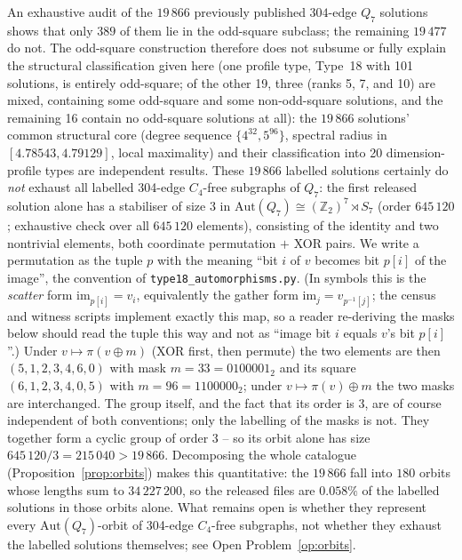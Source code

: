 \documentclass[12pt,a4paper]{article}
\theoremstyle{definition}
\begin{document}
An exhaustive audit of the $19\,866$ previously published $304$-edge $Q_7$
solutions shows that only $389$ of them lie in the odd-square subclass; the
remaining $19\,477$ do not. The odd-square construction therefore does
not subsume or fully explain the structural classification given here
(one profile type, Type~18 with 101 solutions, is entirely odd-square;
of the other 19, three (ranks 5, 7, and 10) are mixed, containing some
odd-square and some non-odd-square solutions, and the remaining 16
contain no odd-square solutions at all): the $19\,866$ solutions'
common structural core (degree sequence $\{4^{32},5^{96}\}$, spectral radius
in $[4.78543,4.79129]$, local maximality) and their classification into 20
dimension-profile types are independent results. These $19\,866$
labelled solutions certainly do \emph{not} exhaust all labelled
304-edge $C_4$-free subgraphs of $Q_7$: the first released solution
alone has a stabiliser of size $3$ in
$\mathrm{Aut}(Q_7)\cong(\mathbb{Z}_2)^7\rtimes S_7$ (order $645\,120$;
exhaustive check over all $645\,120$ elements), consisting of the
identity and two nontrivial elements, both coordinate permutation
$+$ XOR pairs. We write a permutation as the tuple $p$ with the meaning
``bit $i$ of $v$ becomes bit $p[i]$ of the image'', the convention of
\texttt{type18\_automorphisms.py}. (In symbols this is the \emph{scatter}
form $\mathrm{im}_{p[i]}=v_i$, equivalently the gather form
$\mathrm{im}_j=v_{p^{-1}[j]}$; the census and witness scripts implement
exactly this map, so a reader re-deriving the masks below should read the
tuple this way and not as ``image bit $i$ equals $v$'s bit $p[i]$''.) Under $v\mapsto \pi(v\oplus m)$ (XOR first,
then permute) the two elements are then $(5,1,2,3,4,6,0)$ with mask
$m=33=0100001_2$ and its square $(6,1,2,3,4,0,5)$ with $m=96=1100000_2$; under
$v\mapsto \pi(v)\oplus m$ the two masks are interchanged. The group itself,
and the fact that its order is $3$, are of course independent of both
conventions; only the labelling of the masks is not. They together
form a cyclic group of order $3$ -- so its orbit alone has size
$645\,120/3=215\,040>19\,866$. Decomposing the whole catalogue
(Proposition~\ref{prop:orbits}) makes this quantitative: the $19\,866$ fall
into $180$ orbits whose lengths sum to $34\,227\,200$, so the released files
are $0.058\%$ of the labelled solutions in those orbits alone. What remains
open is whether they represent every $\mathrm{Aut}(Q_7)$-orbit of 304-edge
$C_4$-free subgraphs, not whether they exhaust the labelled solutions
themselves; see Open Problem~\ref{op:orbits}.
\end{document}
